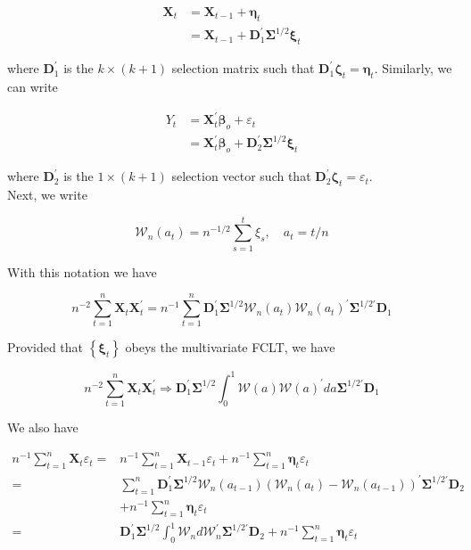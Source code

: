 \documentclass[10pt]{article}
\begin{document}
$$
\begin{aligned}
\mathbf{X}_{t} & =\mathbf{X}_{t-1}+\boldsymbol{\eta}_{t} \\
& =\mathbf{X}_{t-1}+\mathbf{D}_{1}^{\prime} \boldsymbol{\Sigma}^{1 / 2} \boldsymbol{\xi}_{t}
\end{aligned}
$$

where $\mathbf{D}_{1}^{\prime}$ is the $k \times(k+1)$ selection matrix such that $\mathbf{D}_{1}^{\prime} \boldsymbol{\zeta}_{t}=\boldsymbol{\eta}_{t}$. Similarly, we can write

$$
\begin{aligned}
Y_{t} & =\mathbf{X}_{t}^{\prime} \boldsymbol{\beta}_{o}+\varepsilon_{t} \\
& =\mathbf{X}_{t}^{\prime} \boldsymbol{\beta}_{o}+\mathbf{D}_{2}^{\prime} \boldsymbol{\Sigma}^{1 / 2} \boldsymbol{\xi}_{t}
\end{aligned}
$$

where $\mathbf{D}_{2}^{\prime}$ is the $1 \times(k+1)$ selection vector such that $\mathbf{D}_{2}^{\prime} \boldsymbol{\zeta}_{t}=\varepsilon_{t}$.\\
Next, we write

$$
\mathcal{W}_{n}\left(a_{t}\right)=n^{-1 / 2} \sum_{s=1}^{t} \xi_{s}, \quad a_{t}=t / n
$$

With this notation we have

$$
n^{-2} \sum_{t=1}^{n} \mathbf{X}_{t} \mathbf{X}_{t}^{\prime}=n^{-1} \sum_{t=1}^{n} \mathbf{D}_{1}^{\prime} \boldsymbol{\Sigma}^{1 / 2} \mathcal{W}_{n}\left(a_{t}\right) \mathcal{W}_{n}\left(a_{t}\right)^{\prime} \boldsymbol{\Sigma}^{1 / 2 \prime} \mathbf{D}_{1}
$$

Provided that $\left\{\boldsymbol{\xi}_{t}\right\}$ obeys the multivariate FCLT, we have

$$
n^{-2} \sum_{t=1}^{n} \mathbf{X}_{t} \mathbf{X}_{t}^{\prime} \Rightarrow \mathbf{D}_{1}^{\prime} \boldsymbol{\Sigma}^{1 / 2} \int_{0}^{1} \mathcal{W}(a) \mathcal{W}(a)^{\prime} d a \boldsymbol{\Sigma}^{1 / 2 \prime} \mathbf{D}_{1}
$$

We also have

$$
\begin{aligned}
n^{-1} \sum_{t=1}^{n} \mathbf{X}_{t} \varepsilon_{t}= & n^{-1} \sum_{t=1}^{n} \mathbf{X}_{t-1} \varepsilon_{t}+n^{-1} \sum_{t=1}^{n} \boldsymbol{\eta}_{t} \varepsilon_{t} \\
= & \sum_{t=1}^{n} \mathbf{D}_{1}^{\prime} \boldsymbol{\Sigma}^{1 / 2} \mathcal{W}_{n}\left(a_{t-1}\right)\left(\mathcal{W}_{n}\left(a_{t}\right)-\mathcal{W}_{n}\left(a_{t-1}\right)\right)^{\prime} \boldsymbol{\Sigma}^{1 / 2 \prime} \mathbf{D}_{2} \\
& +n^{-1} \sum_{t=1}^{n} \boldsymbol{\eta}_{t} \varepsilon_{t} \\
= & \mathbf{D}_{1}^{\prime} \boldsymbol{\Sigma}^{1 / 2} \int_{0}^{1} \mathcal{W}_{n} d \mathcal{W}_{n}^{\prime} \boldsymbol{\Sigma}^{1 / 2 \prime} \mathbf{D}_{2}+n^{-1} \sum_{t=1}^{n} \boldsymbol{\eta}_{t} \varepsilon_{t}
\end{aligned}
$$
\end{document}
